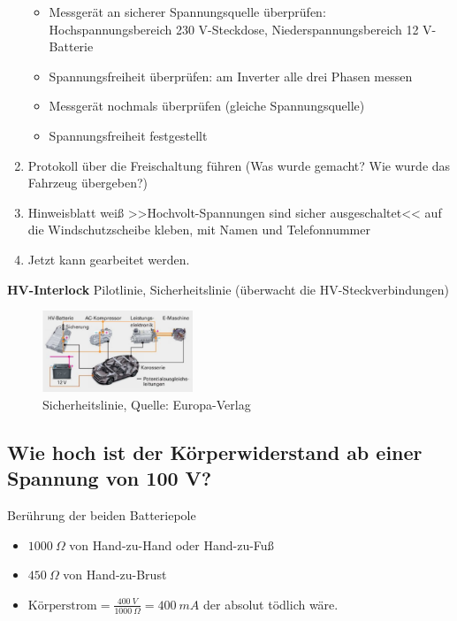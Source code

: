 \begin{enumerate}
  \begin{itemize}
  \item
    Messgerät an sicherer Spannungsquelle überprüfen:
    Hochspannungsbereich 230 V-Steckdose, Niederspannungsbereich 12
    V-Batterie
  \item
    Spannungsfreiheit überprüfen: am Inverter alle drei Phasen messen
  \item
    Messgerät nochmals überprüfen (gleiche Spannungsquelle)
  \item
    Spannungsfreiheit festgestellt
  \end{itemize}
\item
  Protokoll über die Freischaltung führen (Was wurde gemacht? Wie wurde
  das Fahrzeug übergeben?)
\item
  Hinweisblatt weiß >>Hochvolt-Spannungen sind sicher ausgeschaltet<<
  auf die Windschutzscheibe kleben, mit Namen und Telefonnummer
\item
  Jetzt kann gearbeitet werden.
\end{enumerate}

\textbf{HV-Interlock} Pilotlinie, Sicherheitslinie (überwacht die
HV-Steckverbindungen)

\begin{figure}[!ht]%
\centering
\includegraphics[width=0.4\textwidth]{images/HV/HV-7.pdf}
\caption{Sicherheitslinie, Quelle: Europa-Verlag}
\end{figure}

\subsection{Wie hoch ist der Körperwiderstand ab einer Spannung von 100
V?}\label{wie-hoch-ist-der-koerperwiderstand-ab-einer-spannung-von-100-v}

Berührung der beiden Batteriepole

\begin{itemize}
\item
  $1000~\Omega$ von Hand-zu-Hand oder Hand-zu-Fuß
\item
  $450~\Omega$ von Hand-zu-Brust
\item
  $\text{Körperstrom} = \frac{400~V}{1000~\Omega} = 400~mA$ der
  absolut tödlich wäre.
\end{itemize}

